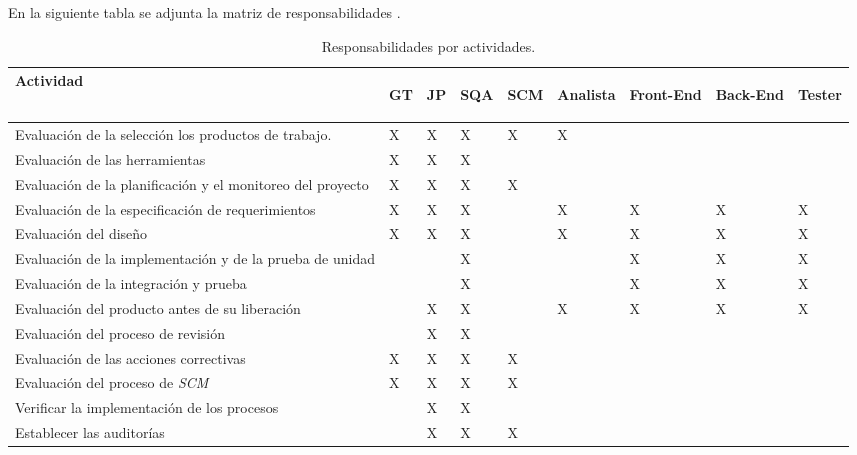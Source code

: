 En la siguiente tabla se adjunta la matriz de responsabilidades \citet{web00}.

\begin{table}[H]
    \caption[Responsabilidades por actividades.] {Responsabilidades por actividades.}
    \label{tbl:responsabilidades por actividades}
    \begin{tabular}{|p{}|p{}|p{}|p{}|p{}|p{}|p{}|p{}|p{}|}
        \hline
        \textbf{Actividad} &  \begin{sideways}\textbf{GT}\end{sideways} & \begin{sideways}\textbf{JP}\end{sideways} & \begin{sideways}\textbf{SQA}\end{sideways} & \begin{sideways}\textbf{SCM}\end{sideways} & \begin{sideways}\textbf{Analista}\end{sideways} & \begin{sideways}\textbf{Front-End}\end{sideways} & \begin{sideways}\textbf{Back-End}\end{sideways} & \begin{sideways}\textbf{Tester}\end{sideways}\\
    	\hline
    	\hline
    	Evaluación	de la selección los productos de trabajo. & X & X & X & X & X & & & \\ \hline
    	Evaluación de las herramientas & X & X & X & & & & & \\ \hline
    	Evaluación de la planificación y el monitoreo del proyecto & X & X & X & X & & & & \\ \hline
    	Evaluación de la especificación de requerimientos & X & X & X & & X & X & X & X \\ \hline
    	Evaluación del diseño & X & X & X & & X & X & X & X \\ \hline
    	Evaluación de la implementación y de la prueba de unidad & & & X & & & X & X & X \\ \hline
    	Evaluación de la integración y prueba & & & X & & & X & X & X \\ \hline
    	Evaluación del producto antes de su liberación & & X & X & & X & X & X & X \\ \hline
    	Evaluación del proceso de revisión & & X & X & & & & & \\ \hline
    	Evaluación de las acciones correctivas & X & X & X & X & & & & \\ \hline
    	Evaluación del proceso de \textit{SCM} & X & X & X & X & & & & \\ \hline
    	Verificar la implementación de los procesos & & X & X & & & & & \\ \hline
    	Establecer las auditorías & & X & X & X & & & & \\ \hline
    	

\end{tabular}
\end{table}
